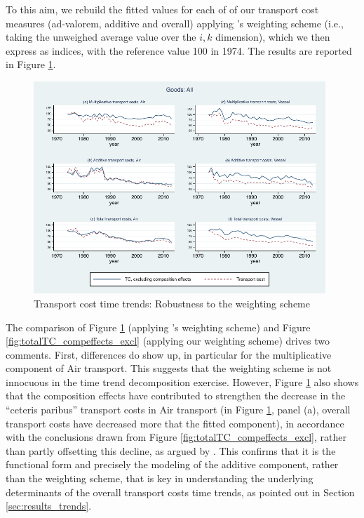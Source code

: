 \documentclass[a4paper,11pt]{article}
\begin{document}
To this aim, we rebuild the fitted values for each of of our transport cost measures (ad-valorem, additive and overall) applying \citet{hummels2007}'s weighting scheme (i.e., taking the unweighed average value over the $i,k$ dimension), which we then express as indices, with the reference value 100 in 1974. The results are reported in Figure \ref{fig:compeffects_robustness}.

\begin{figure}[htbp]
\caption{Transport cost time trends: Robustness to the weighting scheme}
\label{fig:compeffects_robustness}
\begin{center}
\includegraphics[height=8cm]
{graph_composition_all_np.pdf}
\end{center}
\end{figure}

The comparison of Figure \ref{fig:compeffects_robustness} (applying \citet{hummels2007}'s weighting scheme) and Figure \ref{fig:totalTC_compeffects_excl} (applying our weighting scheme) drives two comments. First, differences do show up, in particular for the multiplicative component of Air transport. This suggests that the weighting scheme is not innocuous in the time trend decomposition exercise. However, Figure \ref{fig:compeffects_robustness} also shows that the composition effects have contributed to strengthen the decrease in the ``ceteris paribus'' transport costs in Air transport (in Figure \ref{fig:compeffects_robustness}, panel (a), overall transport costs have decreased more that the fitted component), in accordance with the conclusions drawn from Figure \ref{fig:totalTC_compeffects_excl}, rather than partly offsetting this decline, as argued by \cite{hummels2007}. This confirms that it is the functional form and precisely the modeling of the additive component, rather than the weighting scheme, that is key in understanding the underlying determinants of the overall transport costs time trends, as pointed out in Section \ref{sec:results_trends}.
\end{document}
